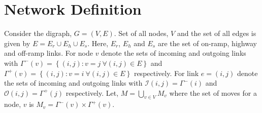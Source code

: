 \documentclass{article}
\begin{document}
\section*{Network Definition}
Consider the digraph, $G = (V, E)$. Set of all nodes, $V$ and the set of all edges is given by $E = E_{r} \cup E_{h} \cup E_{s}$. Here, $E_{r}$, $E_{h}$ and $E_{s}$ are the set of on-ramp, highway and off-ramp links. For node $v$ denote the sets of incoming and outgoing links with 
$\Gamma^-(v) = \left\lbrace (i, j): v=j ~\forall (i, j) \in E \right\rbrace$ 
and $\Gamma^+(v) = \left\lbrace (i, j): v=i ~\forall (i, j) \in E \right\rbrace$ 
respectively. For link $e = (i, j)$ denote the sets of incoming and outgoing links with 
$\mathcal{I}(i, j) = \Gamma^{-}(i)$ and $\mathcal{O}(i, j) = \Gamma^{+}(j)$ respectively. 
Let, $M = \bigcup\limits_{v \in V} M_v$ where the set of moves for a node, $v$ is 
$M_v = \Gamma^-(v) \times \Gamma^+(v)$.
\end{document}
